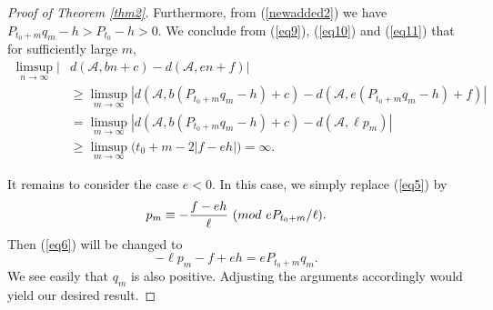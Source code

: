 \documentclass[10pt,a4paper]{amsart}
\def\pmod #1{\ ({\rm{mod}}\ #1)}
\begin{document}
\begin{proof}[Proof of Theorem \ref{thm2}]
Furthermore, from (\ref{newadded2}) we have 
$
P_{t_0+m}q_m-h>P_{t_0}-h>0.
$
We conclude from (\ref{eq9}), (\ref{eq10}) and (\ref{eq11}) that for sufficiently large $m$,
\begin{align*}
\limsup_{n\rightarrow\infty}|&d(\mathcal{A},bn+c)-d(\mathcal{A},en+f)|\\
&\ge\limsup_{m\rightarrow\infty}|d(\mathcal{A},b(P_{t_0+m}q_m-h)+c)-d(\mathcal{A},e(P_{t_0+m}q_m-h)+f)|\\
&=\limsup_{m\rightarrow\infty}|d(\mathcal{A},b(P_{t_0+m}q_m-h)+c)-d(\mathcal{A},\ell p_m)|\\
&\ge \limsup_{m\rightarrow\infty}\big(t_0+m-2|f-eh|\big)=\infty.
\end{align*}

It remains to consider the case $e<0$. In this case, we simply replace (\ref{eq5}) by
$$
p_m\equiv -\frac{f-eh}{\ell} \pmod{eP_{t_0+m}/\ell}.
$$
Then (\ref{eq6}) will be changed to
$$
-\ell p_m-f+eh=eP_{t_0+m}q_m.
$$
We see easily that $q_m$ is also positive. Adjusting the arguments accordingly would yield our desired result. 
\end{proof}
\end{document}
